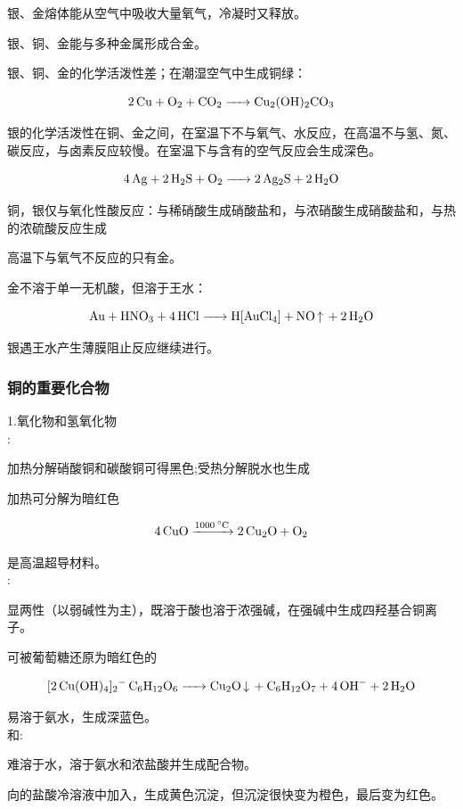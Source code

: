 \documentclass[a4paper,UTF8]{article}
\begin{document}
银、金熔体能从空气中吸收大量氧气，冷凝时又释放。

银、铜、金能与多种金属形成合金。

银、铜、金的化学活泼性差；在潮湿空气中生成铜绿：

$$ \ce{2Cu + O2 + CO2 -> Cu2(OH)2CO3} $$

银的化学活泼性在铜、金之间，在室温下不与氧气、水反应，在高温不与氢、氮、碳反应，与卤素反应较慢。在室温下与含有的空气反应会生成深色。

$$ \ce{4Ag + 2H2S + O2 -> 2Ag2S + 2H2O} $$

铜，银仅与氧化性酸反应：与稀硝酸生成硝酸盐和，与浓硝酸生成硝酸盐和，与热的浓硫酸反应生成

高温下与氧气不反应的只有金。

金不溶于单一无机酸，但溶于王水：

$$ \ce{Au + HNO3 + 4HCl ->H[AuCl4] + NO\ce{^} + 2H2O} $$

银遇王水产生薄膜阻止反应继续进行。

\subsubsection{铜的重要化合物}
1.氧化物和氢氧化物\\

:

加热分解硝酸铜和碳酸铜可得黑色;受热分解脱水也生成

加热可分解为暗红色

$$ \ce{4CuO ->[1000^\circ C] 2Cu2O + O2} $$

是高温超导材料。\\

:

显两性（以弱碱性为主），既溶于酸也溶于浓强碱，在强碱中生成四羟基合铜离子。

可被葡萄糖还原为暗红色的

$$ \ce{[2Cu(OH)4]2- C6H12O6 -> Cu2O\ce{v} + C6H12O7 + 4OH- + 2H2O} $$

易溶于氨水，生成深蓝色。\\

和:

难溶于水，溶于氨水和浓盐酸并生成配合物。

向的盐酸冷溶液中加入，生成黄色沉淀，但沉淀很快变为橙色，最后变为红色。
\end{document}
